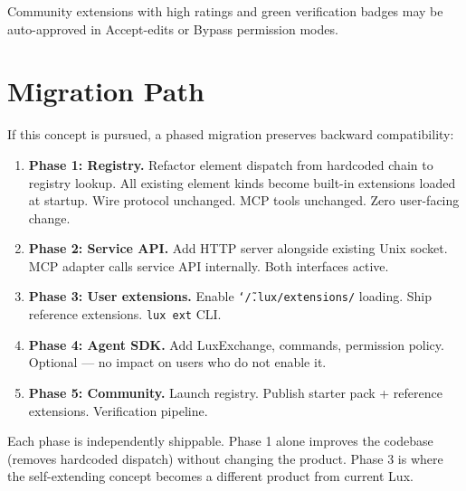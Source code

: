 \documentclass[a4paper,10pt]{article}
\begin{document}
Community extensions with high ratings and green verification
badges may be auto-approved in Accept-edits or Bypass permission
modes.

\section{Migration Path}

If this concept is pursued, a phased migration preserves backward
compatibility:

\begin{enumerate}
  \item \textbf{Phase 1: Registry.}  Refactor element dispatch from
    hardcoded chain to registry lookup.  All existing element kinds
    become built-in extensions loaded at startup.  Wire protocol
    unchanged.  MCP tools unchanged.  Zero user-facing change.
  \item \textbf{Phase 2: Service API.}  Add HTTP server alongside
    existing Unix socket.  MCP adapter calls service API internally.
    Both interfaces active.
  \item \textbf{Phase 3: User extensions.}  Enable
    \texttt{\char`\~/.lux/extensions/} loading.  Ship reference
    extensions.  \texttt{lux ext} CLI.
  \item \textbf{Phase 4: Agent SDK.}  Add LuxExchange, commands,
    permission policy.  Optional --- no impact on users who do not
    enable it.
  \item \textbf{Phase 5: Community.}  Launch registry.  Publish
    starter pack + reference extensions.  Verification pipeline.
\end{enumerate}

Each phase is independently shippable.  Phase 1 alone improves
the codebase (removes hardcoded dispatch) without changing the
product.  Phase 3 is where the self-extending concept becomes a
different product from current Lux.
\end{document}
